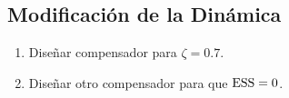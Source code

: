\subsection{Modificación de la Dinámica}
\begin{enumerate}[label=3.\arabic*.]
	\item Diseñar compensador para $\zeta = 0.7$.
	
	\item Diseñar otro compensador para que $\mathrm{ESS} = 0$.
	
\end{enumerate}
